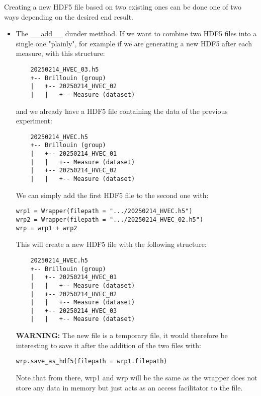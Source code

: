 Creating a new HDF5 file based on two existing ones can be done one of two ways depending on the desired end result.
\begin{itemize}
    \item The \hyperref[subsec:wrapper.__add__]{\_\_add\_\_} dunder metthod. If we want to combine two HDF5 files into a single one "plainly", for example if we are generating a new HDF5 after each measure, with this structure:
    \begin{verbatim}
    20250214_HVEC_03.h5
    +-- Brillouin (group)
    |   +-- 20250214_HVEC_02
    |   |   +-- Measure (dataset)
    \end{verbatim}
    and we already have a HDF5 file containing the data of the previous experiment:
    \begin{verbatim}
    20250214_HVEC.h5
    +-- Brillouin (group)
    |   +-- 20250214_HVEC_01
    |   |   +-- Measure (dataset)
    |   +-- 20250214_HVEC_02
    |   |   +-- Measure (dataset)
    \end{verbatim}
    We can simply add the first HDF5 file to the second one with:
\begin{lstlisting}
wrp1 = Wrapper(filepath = ".../20250214_HVEC.h5")
wrp2 = Wrapper(filepath = ".../20250214_HVEC_02.h5")
wrp = wrp1 + wrp2
\end{lstlisting}
    This will create a new HDF5 file with the following structure:
    \begin{verbatim}
    20250214_HVEC.h5
    +-- Brillouin (group)
    |   +-- 20250214_HVEC_01
    |   |   +-- Measure (dataset)
    |   +-- 20250214_HVEC_02
    |   |   +-- Measure (dataset)
    |   +-- 20250214_HVEC_03
    |   |   +-- Measure (dataset)
    \end{verbatim}
    \textbf{WARNING:} The new file is a temporary file, it would therefore be interesting to save it after the addition of the two files with:
\begin{lstlisting}
wrp.save_as_hdf5(filepath = wrp1.filepath)
\end{lstlisting}
    Note that from there, wrp1 and wrp will be the same as the wrapper does not store any data in memory but just acts as an access facilitator to the file.


\end{itemize}
